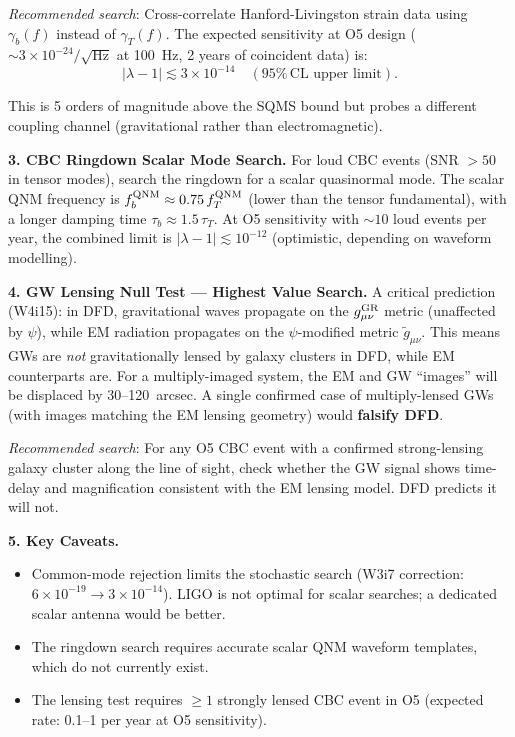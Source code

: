 \documentclass[11pt]{article}
\newcommand{\ee}[1]{\times 10^{#1}}
\newcommand{\lbone}{|\lambda - 1|}
\begin{document}
\begin{tcolorbox}[colback=white, colframe=black, breakable,
  title=\textbf{WHITE PAPER: Searching for Scalar Breathing Modes
  in LIGO O5 Data}]
\textit{Recommended search}: Cross-correlate Hanford-Livingston strain
data using $\gamma_b(f)$ instead of $\gamma_T(f)$. The expected
sensitivity at O5 design ($\sim 3\ee{-24}/\sqrt{\text{Hz}}$ at
100~Hz, 2 years of coincident data) is:
\begin{equation}
\lbone \lesssim 3\ee{-14} \quad (95\%\,\text{CL upper limit}).
\end{equation}

This is 5 orders of magnitude above the SQMS bound but probes a
different coupling channel (gravitational rather than electromagnetic).

\bigskip

\textbf{3. CBC Ringdown Scalar Mode Search.}
For loud CBC events (SNR $> 50$ in tensor modes), search the ringdown
for a scalar quasinormal mode. The scalar QNM frequency is
$f_b^{\rm QNM} \approx 0.75\,f_T^{\rm QNM}$ (lower than the tensor
fundamental), with a longer damping time $\tau_b \approx 1.5\,\tau_T$.
At O5 sensitivity with $\sim 10$ loud events per year, the combined
limit is $\lbone \lesssim 10^{-12}$ (optimistic, depending on waveform
modelling).

\bigskip

\textbf{4. GW Lensing Null Test --- Highest Value Search.}
A critical prediction (W4i15): in DFD, gravitational waves propagate on
the $g_{\mu\nu}^{\rm GR}$ metric (unaffected by $\psi$), while EM
radiation propagates on the $\psi$-modified metric $\tilde{g}_{\mu\nu}$.
This means GWs are \emph{not} gravitationally lensed by galaxy clusters
in DFD, while EM counterparts are. For a multiply-imaged system, the
EM and GW ``images'' will be displaced by 30--120~arcsec. A single
confirmed case of multiply-lensed GWs (with images matching the EM
lensing geometry) would \textbf{falsify DFD}.

\textit{Recommended search}: For any O5 CBC event with a confirmed
strong-lensing galaxy cluster along the line of sight, check whether
the GW signal shows time-delay and magnification consistent with the
EM lensing model. DFD predicts it will not.

\bigskip

\textbf{5. Key Caveats.}
\begin{itemize}[nosep]
\item Common-mode rejection limits the stochastic search (W3i7
  correction: $6\ee{-19} \to 3\ee{-14}$). LIGO is not optimal for
  scalar searches; a dedicated scalar antenna would be better.
\item The ringdown search requires accurate scalar QNM waveform
  templates, which do not currently exist.
\item The lensing test requires $\geq 1$ strongly lensed CBC event in
  O5 (expected rate: 0.1--1 per year at O5 sensitivity).
\end{itemize}


\end{tcolorbox}
\end{document}
